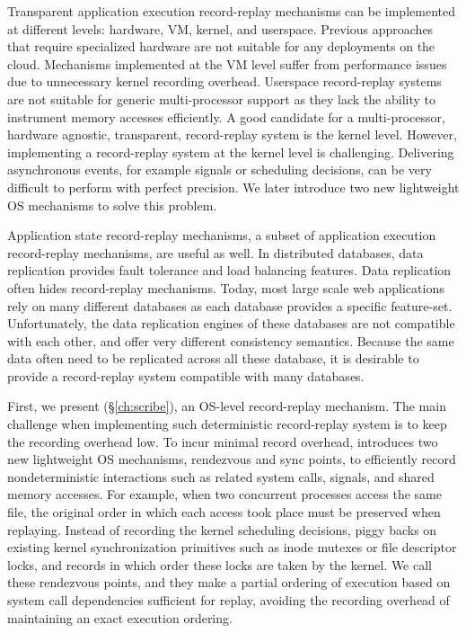 Transparent application execution record-replay mechanisms can be implemented at different levels:
hardware, VM, kernel, and userspace. Previous approaches that require
specialized hardware are not suitable for any deployments on the cloud.
Mechanisms implemented at the VM level suffer from performance issues
due to unnecessary kernel recording overhead.  Userspace record-replay systems
are not suitable for generic multi-processor support as they lack the ability to
instrument memory accesses efficiently. A good candidate for
a multi-processor, hardware agnostic, transparent, record-replay system is the
kernel level. However, implementing a record-replay system at the kernel level
is challenging. Delivering asynchronous events, for example signals or
scheduling decisions, can be very difficult to perform with perfect precision.
We later introduce two new lightweight OS mechanisms to solve this problem.

Application state record-replay mechanisms, a subset of application execution
record-replay mechanisms, are useful as well.  In distributed
databases, data replication provides fault tolerance and load balancing
features. Data replication often hides record-replay mechanisms.
Today, most large scale web applications rely on many different databases as
each database provides a specific feature-set. Unfortunately, the data replication
engines of these databases are not compatible with each other, and offer very
different consistency semantics. Because the same data often need to be
replicated across all these database, it is desirable to provide a
record-replay system compatible with many databases.

First, we present \scribe (\S\ref{ch:scribe}), an OS-level record-replay
mechanism. The main challenge when implementing such deterministic record-replay
system is to keep the recording overhead low. To incur minimal record overhead,
\scribe introduces two new lightweight OS mechanisms, rendezvous and sync
points, to efficiently record nondeterministic interactions such as related
system calls, signals, and shared memory accesses. For example, when
two concurrent processes access the same file, the original order in which
each access took place must be preserved when replaying.
Instead of recording the kernel scheduling decisions, \scribe piggy backs on
existing kernel synchronization primitives such as inode mutexes or file
descriptor locks, and records in which order these locks are taken by the kernel.
We call these rendezvous points, and they make a partial ordering of execution
based on system call dependencies sufficient for replay, avoiding the recording
overhead of maintaining an exact execution ordering.

